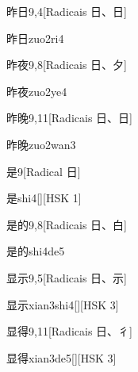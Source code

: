\begin{entry}{昨日}{9,4}[Radicais ⽇、⽇]
  \begin{phonetics}{昨日}{zuo2ri4}
  \end{phonetics}
\end{entry}

\begin{entry}{昨夜}{9,8}[Radicais ⽇、⼣]
  \begin{phonetics}{昨夜}{zuo2ye4}
  \end{phonetics}
\end{entry}

\begin{entry}{昨晚}{9,11}[Radicais ⽇、⽇]
  \begin{phonetics}{昨晚}{zuo2wan3}
  \end{phonetics}
\end{entry}

\begin{entry}{是}{9}[Radical ⽇]
  \begin{phonetics}{是}{shi4}[][HSK 1]
  \end{phonetics}
\end{entry}

\begin{entry}{是的}{9,8}[Radicais ⽇、⽩]
  \begin{phonetics}{是的}{shi4de5}
  \end{phonetics}
\end{entry}

\begin{entry}{显示}{9,5}[Radicais ⽇、⽰]
  \begin{phonetics}{显示}{xian3shi4}[][HSK 3]
  \end{phonetics}
\end{entry}

\begin{entry}{显得}{9,11}[Radicais ⽇、⼻]
  \begin{phonetics}{显得}{xian3de5}[][HSK 3]
  \end{phonetics}
\end{entry}

